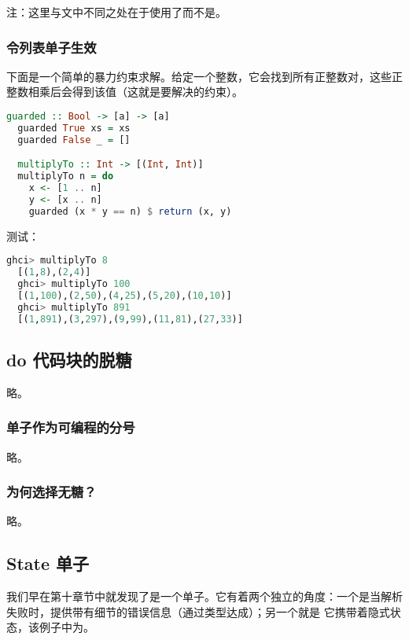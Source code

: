 \documentclass[./main.tex]{subfiles}
\begin{document}
注：这里与文中不同之处在于使用了而不是。

\subsubsection*{令列表单子生效}

下面是一个简单的暴力约束求解。给定一个整数，它会找到所有正整数对，这些正整数相乘后会得到该值（这就是要解决的约束）。

\begin{lstlisting}[language=Haskell]
  guarded :: Bool -> [a] -> [a]
  guarded True xs = xs
  guarded False _ = []

  multiplyTo :: Int -> [(Int, Int)]
  multiplyTo n = do
    x <- [1 .. n]
    y <- [x .. n]
    guarded (x * y == n) $ return (x, y)
\end{lstlisting}

测试：

\begin{lstlisting}[language=Haskell]
  ghci> multiplyTo 8
  [(1,8),(2,4)]
  ghci> multiplyTo 100
  [(1,100),(2,50),(4,25),(5,20),(10,10)]
  ghci> multiplyTo 891
  [(1,891),(3,297),(9,99),(11,81),(27,33)]
\end{lstlisting}

\subsection*{do 代码块的脱糖}

略。

\subsubsection*{单子作为可编程的分号}

略。

\subsubsection*{为何选择无糖？}

略。

\subsection*{State 单子}

我们早在第十章节中就发现了是一个单子。它有着两个独立的角度：一个是当解析失败时，提供带有细节的错误信息（通过类型达成）；另一个就是
它携带着隐式状态，该例子中为。
\end{document}
